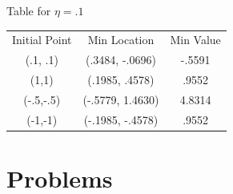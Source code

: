 \documentclass{homework}
\begin{document}
\begin{itemize}
    Table for \(\eta = .1\)
    \begin{table}[H]
        \begin{tabular}{c|c|c}
        Initial Point & Min Location     & Min Value \\
        (.1, .1)      & (.3484, -.0696)  & -.5591    \\
        (1,1)         & (.1985, .4578)   & .9552     \\
        (-.5,-.5)     & (-.5779, 1.4630) & 4.8314    \\
        (-1,-1)       & (-.1985, -.4578) & .9552    
        \end{tabular}
    \end{table}
\end{itemize}

\section{Problems}
\end{document}
